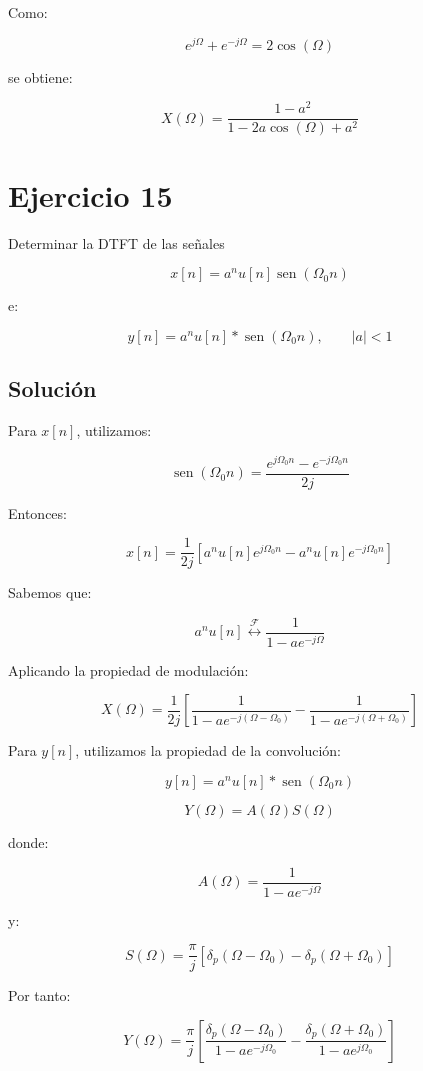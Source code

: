 \documentclass[fleqn]{article}
\DeclareMathOperator{\sen}{sen}
\begin{document}
	Como:

	\[
	e^{j\Omega}+e^{-j\Omega}
	=
	2\cos(\Omega)
	\]

	se obtiene:

	\[
	\boxed{
	X(\Omega)
	=
	\frac{1-a^2}
	{1-2a\cos(\Omega)+a^2}
	}
	\]

\section{Ejercicio 15}
	Determinar la DTFT de las señales

	\[
	x[n]
	=
	a^nu[n]\sen(\Omega_0n)
	\]

	e:

	\[
	y[n]
	=
	a^nu[n]*\sen(\Omega_0n),
	\qquad |a|<1
	\]

	\subsection{Solución}

	Para $x[n]$, utilizamos:

	\[
	\sen(\Omega_0n)
	=
	\frac{
	e^{j\Omega_0n}
	-
	e^{-j\Omega_0n}
	}{2j}
	\]

	Entonces:

	\[
	x[n]
	=
	\frac{1}{2j}
	\left[
	a^nu[n]e^{j\Omega_0n}
	-
	a^nu[n]e^{-j\Omega_0n}
	\right]
	\]

	Sabemos que:

	\[
	a^nu[n]
	\overset{\mathcal{F}}{\longleftrightarrow}
	\frac{1}{1-ae^{-j\Omega}}
	\]

	Aplicando la propiedad de modulación:

	\[
	\boxed{
	X(\Omega)
	=
	\frac{1}{2j}
	\left[
	\frac{1}
	{1-ae^{-j(\Omega-\Omega_0)}}
	-
	\frac{1}
	{1-ae^{-j(\Omega+\Omega_0)}}
	\right]
	}
	\]

	Para $y[n]$, utilizamos la propiedad de la convolución:

	\[
	y[n]
	=
	a^nu[n]*\sen(\Omega_0n)
	\]

	\[
	Y(\Omega)
	=
	A(\Omega)S(\Omega)
	\]

	donde:

	\[
	A(\Omega)
	=
	\frac{1}{1-ae^{-j\Omega}}
	\]

	y:

	\[
	S(\Omega)
	=
	\frac{\pi}{j}
	\left[
	\delta_p(\Omega-\Omega_0)
	-
	\delta_p(\Omega+\Omega_0)
	\right]
	\]

	Por tanto:

	\[
	Y(\Omega)
	=
	\frac{\pi}{j}
	\left[
	\frac{
	\delta_p(\Omega-\Omega_0)
	}{
	1-ae^{-j\Omega_0}
	}
	-
	\frac{
	\delta_p(\Omega+\Omega_0)
	}{
	1-ae^{j\Omega_0}
	}
	\right]
	\]
\end{document}
